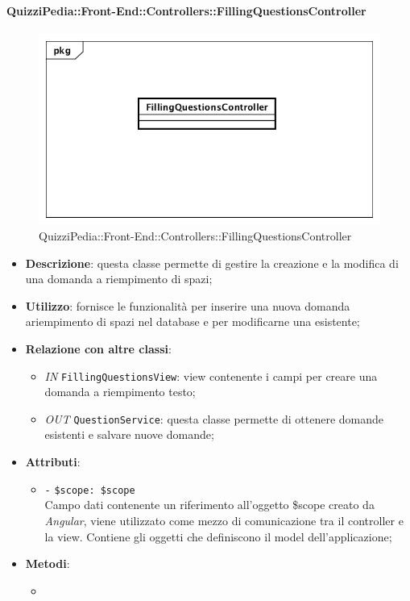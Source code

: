 \paragraph{QuizziPedia::Front-End::Controllers::FillingQuestionsController}
\begin{figure}
	\centering
	\includegraphics[scale=0.45]{UML/Classi/Front-End/QuizziPedia_Front-end_Controller_FillingQuestionsController.png}
	\caption{QuizziPedia::Front-End::Controllers::FillingQuestionsController}
\end{figure}
\begin{itemize}
	\item \textbf{Descrizione}: questa classe permette di gestire la creazione e la modifica di una domanda a riempimento di spazi;
	\item \textbf{Utilizzo}: fornisce le funzionalità per inserire una nuova domanda ariempimento di spazi nel database e per modificarne una esistente;
	\item \textbf{Relazione con altre classi}:
	\begin{itemize}
		\item \textit{IN} \texttt{FillingQuestionsView}: view contenente i campi per creare una domanda a riempimento testo; 
		\item \textit{OUT} \texttt{QuestionService}: questa classe permette di ottenere domande esistenti e salvare nuove domande;
	\end{itemize}
	\item \textbf{Attributi}:
	\begin{itemize}
		\item \texttt{-} \texttt{\$scope: \$scope} \\
		Campo dati contenente un riferimento all’oggetto \$scope creato da \textit{Angular}, viene utilizzato come mezzo di comunicazione tra il controller e la view. Contiene gli oggetti che definiscono il model dell’applicazione;
	\end{itemize}
	\item \textbf{Metodi}:
	\begin{itemize}
		\item 
	\end{itemize}
\end{itemize}

